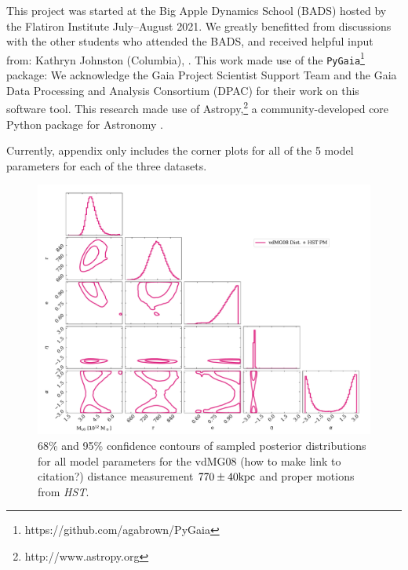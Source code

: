 \documentclass[twocolumn]{aastex631}
\begin{document}






\begin{acknowledgements}

This project was started at the Big Apple Dynamics School (BADS) hosted by the
Flatiron Institute July--August 2021.
We greatly benefitted from discussions with the other students who attended the
BADS, and received helpful input from:
Kathryn Johnston (Columbia),
.
This work made use of the
\texttt{PyGaia}\footnote{https://github.com/agabrown/PyGaia} package: We
acknowledge the Gaia Project Scientist Support Team and the Gaia Data Processing
and Analysis Consortium (DPAC) for their work on this software tool.
This research made use of Astropy,\footnote{http://www.astropy.org} a
community-developed core Python package for Astronomy \citep{astropy:2013,
astropy:2018}.
\end{acknowledgements}


\appendix
Currently, appendix only includes the corner plots for all of the 5 model parameters for each of the three datasets.
\begin{figure}[htb]
  \centering
  \includegraphics[width=0.8\columnwidth]{analyze-runs-all-vdm2012.pdf}
  \caption{\label{fig:contour-vdm}
  68\% and 95\% confidence contours of sampled posterior distributions for all
  model parameters for the vdMG08 (how to make link to citation?) distance
  measurement $770\pm 40 \rm kpc$ and proper motions from \textit{HST}.
  }
\end{figure}
\end{document}

